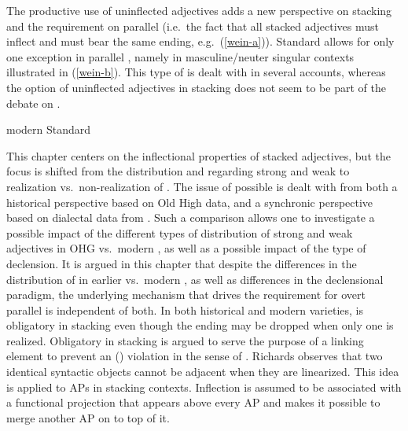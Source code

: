 \documentclass[output=paper,colorlinks,citecolor=brown]{langscibook}
\begin{document}
The productive use of uninflected adjectives adds a new perspective on stacking and the requirement on parallel  (i.e.~the fact that all stacked adjectives must inflect and must bear the same ending, e.g.~(\ref{wein-a})). Standard  allows for only one exception in parallel , namely in  masculine/neuter singular contexts illustrated in (\ref{wein-b}). This type of  is dealt with in several accounts, whereas the option of uninflected adjectives in stacking does not seem to be part of the debate on .

\ea \label{wein} modern Standard \\
\z 
\z

This chapter centers on the inflectional properties of stacked adjectives, but the focus is shifted from the distribution and  regarding strong and weak  to realization vs.~non-realization of . The issue of possible  is dealt with from both a historical perspective based on Old High  data, and a synchronic perspective based on dialectal data from . Such a comparison allows one to investigate a possible impact of the different types of distribution of strong and weak adjectives in OHG vs.~modern , as well as a possible impact of the type of declension. It is argued in this chapter that despite the differences in the distribution of  in earlier vs.~modern , as well as differences in the declensional paradigm, the underlying mechanism that drives the requirement for overt parallel  is independent of both. In both historical and modern varieties,  is obligatory in stacking even though the ending may be dropped when only one  is realized. Obligatory  in stacking is argued to serve the purpose of a linking element to prevent an  () violation in the sense of \citet[4]{richards2010uttering}. Richards observes that two identical syntactic objects cannot be adjacent when they are linearized. This idea is applied to APs in stacking contexts. Inflection is assumed to be associated with a functional projection that appears above every AP and makes it possible to merge another AP on to top of it.
\end{document}
